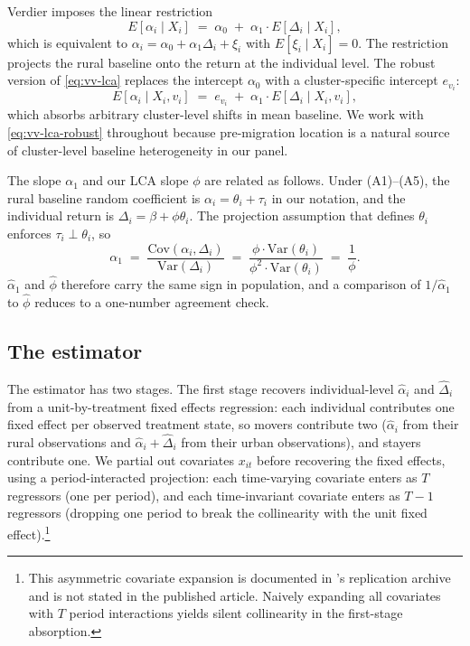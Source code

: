 Verdier imposes the linear restriction
\begin{equation}\label{eq:vv-lca}
E\!\left[\alpha_i \mid X_i\right] \;=\; \alpha_0 \;+\; \alpha_1 \cdot E\!\left[\Delta_i \mid X_i\right],
\end{equation}
which is equivalent to $\alpha_i = \alpha_0 + \alpha_1 \Delta_i + \xi_i$ with $E\!\left[\xi_i \mid X_i\right] = 0$.
The restriction projects the rural baseline onto the return at the individual level.
The robust version of \eqref{eq:vv-lca} replaces the intercept $\alpha_0$ with a cluster-specific intercept $e_{v_i}$:
\begin{equation}\label{eq:vv-lca-robust}
E\!\left[\alpha_i \mid X_i, v_i\right] \;=\; e_{v_i} \;+\; \alpha_1 \cdot E\!\left[\Delta_i \mid X_i, v_i\right],
\end{equation}
which absorbs arbitrary cluster-level shifts in mean baseline.
We work with \eqref{eq:vv-lca-robust} throughout because pre-migration location is a natural source of cluster-level baseline heterogeneity in our panel.

The slope $\alpha_1$ and our LCA slope $\phi$ are related as follows.
Under (A1)--(A5), the rural baseline random coefficient is $\alpha_i = \theta_i + \tau_i$ in our notation, and the individual return is $\Delta_i = \beta + \phi\theta_i$.
The projection assumption that defines $\theta_i$ enforces $\tau_i \perp \theta_i$, so
\begin{equation}\label{eq:alpha1-phi-relation}
\alpha_1 \;=\; \frac{\mathrm{Cov}(\alpha_i, \Delta_i)}{\mathrm{Var}(\Delta_i)} \;=\; \frac{\phi \cdot \mathrm{Var}(\theta_i)}{\phi^2 \cdot \mathrm{Var}(\theta_i)} \;=\; \frac{1}{\phi}.
\end{equation}
$\hat\alpha_1$ and $\hat\phi$ therefore carry the same sign in population, and a comparison of $1/\hat\alpha_1$ to $\hat\phi$ reduces to a one-number agreement check.

\subsection{The estimator}\label{app:vv-rob-estimator}

The estimator has two stages.
The first stage recovers individual-level $\hat\alpha_i$ and $\hat\Delta_i$ from a unit-by-treatment fixed effects regression: each individual contributes one fixed effect per observed treatment state, so movers contribute two ($\hat\alpha_i$ from their rural observations and $\hat\alpha_i + \hat\Delta_i$ from their urban observations), and stayers contribute one.
We partial out covariates $x_{it}$ before recovering the fixed effects, using a period-interacted projection: each time-varying covariate enters as $T$ regressors (one per period), and each time-invariant covariate enters as $T-1$ regressors (dropping one period to break the collinearity with the unit fixed effect).\footnote{This asymmetric covariate expansion is documented in \citet{verdierAverageTreatmentEffects2020a}'s replication archive and is not stated in the published article.
Naively expanding all covariates with $T$ period interactions yields silent collinearity in the first-stage absorption.}

